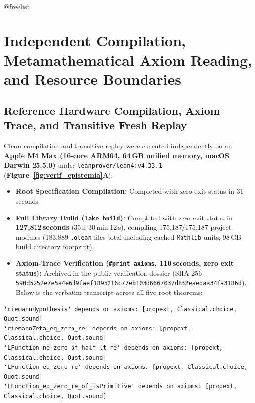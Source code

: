 \documentclass[11pt,a4paper]{article}
\makeatletter
\newcommand{\code}[1]{\texttt{\small #1}}
\providecommand{\FloatBarrier}{%
  \par
  \expandafter\ifx\csname @freelist\endcsname\relax\else
    \ifx\@deferlist\@empty\else
      \clearpage
    \fi
  \fi
}
\let\orig@section\section
\renewcommand{\section}{\FloatBarrier\orig@section}
\makeatother
\begin{document}
\section{Independent Compilation, Metamathematical Axiom Reading, and Resource Boundaries}

\subsection{Reference Hardware Compilation, Axiom Trace, and Transitive Fresh Replay}

Clean compilation and transitive replay were executed independently on an \textbf{Apple M4 Max (16-core ARM64, 64\,GB unified memory, macOS Darwin 25.5.0)} under \texttt{leanprover/lean4:v4.33.1} (\textbf{Figure~\ref{fig:verif_epistemia}A}):
\begin{itemize}
  \item \textbf{Root Specification Compilation:} Completed with zero exit status in 31\,seconds.
  \item \textbf{Full Library Build (\texttt{lake build}):} Completed with zero exit status in \textbf{127,812\,seconds} (35\,h 30\,min 12\,s), compiling 175,187/175,187 project modules (183,889 \texttt{.olean} files total including cached \texttt{Mathlib} units; 98\,GB build directory footprint).
  \item \textbf{Axiom-Trace Verification (\texttt{\#print axioms}, 110\,seconds, zero exit status):} Archived in the public verification dossier (SHA-256 \code{590d5252e7e5a4e6\allowbreak d9faef1895216c77\allowbreak eb103d6667037d83\allowbreak 2eaedaa34fa3186d}). Below is the verbatim transcript across all five root theorems:
\end{itemize}

{\scriptsize
\begin{verbatim}
'riemannHypothesis' depends on axioms: [propext, Classical.choice, Quot.sound]
'riemannZeta_eq_zero_re' depends on axioms: [propext, Classical.choice, Quot.sound]
'LFunction_ne_zero_of_half_lt_re' depends on axioms: [propext, Classical.choice, Quot.sound]
'LFunction_eq_zero_re' depends on axioms: [propext, Classical.choice, Quot.sound]
'LFunction_eq_zero_re_of_isPrimitive' depends on axioms: [propext, Classical.choice, Quot.sound]
\end{verbatim}
}
\end{document}

